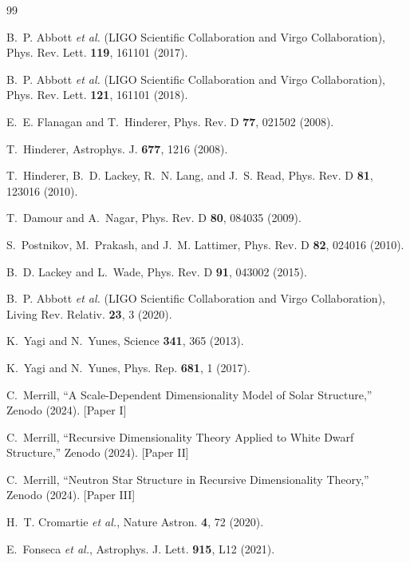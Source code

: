 \documentclass[twocolumn,showpacs,preprintnumbers,amsmath,amssymb,prd]{revtex4-2}
\begin{document}

\begin{thebibliography}{99}

B.~P. Abbott \textit{et al.} (LIGO Scientific Collaboration and Virgo Collaboration),
Phys. Rev. Lett. \textbf{119}, 161101 (2017).

B.~P. Abbott \textit{et al.} (LIGO Scientific Collaboration and Virgo Collaboration),
Phys. Rev. Lett. \textbf{121}, 161101 (2018).

E.~E. Flanagan and T.~Hinderer,
Phys. Rev. D \textbf{77}, 021502 (2008).

T.~Hinderer,
Astrophys. J. \textbf{677}, 1216 (2008).

T.~Hinderer, B.~D. Lackey, R.~N. Lang, and J.~S. Read,
Phys. Rev. D \textbf{81}, 123016 (2010).

T.~Damour and A.~Nagar,
Phys. Rev. D \textbf{80}, 084035 (2009).

S.~Postnikov, M.~Prakash, and J.~M. Lattimer,
Phys. Rev. D \textbf{82}, 024016 (2010).

B.~D. Lackey and L.~Wade,
Phys. Rev. D \textbf{91}, 043002 (2015).

B.~P. Abbott \textit{et al.} (LIGO Scientific Collaboration and Virgo Collaboration),
Living Rev. Relativ. \textbf{23}, 3 (2020).

K.~Yagi and N.~Yunes,
Science \textbf{341}, 365 (2013).

K.~Yagi and N.~Yunes,
Phys. Rep. \textbf{681}, 1 (2017).

C.~Merrill,
``A Scale-Dependent Dimensionality Model of Solar Structure,''
Zenodo (2024). [Paper I]

C.~Merrill,
``Recursive Dimensionality Theory Applied to White Dwarf Structure,''
Zenodo (2024). [Paper II]

C.~Merrill,
``Neutron Star Structure in Recursive Dimensionality Theory,''
Zenodo (2024). [Paper III]

H.~T. Cromartie \textit{et al.},
Nature Astron. \textbf{4}, 72 (2020).

E.~Fonseca \textit{et al.},
Astrophys. J. Lett. \textbf{915}, L12 (2021).


\end{thebibliography}
\end{document}
